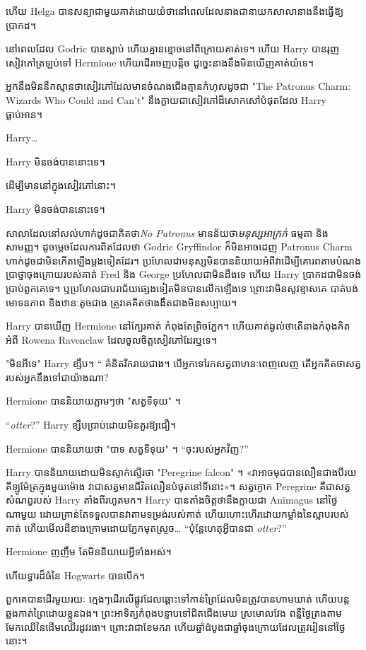 ហើយ Helga បានសន្យាជាមួយគាត់ដោយយំថានៅពេលដែលនាងជានាយកសាលានាងនឹងធ្វើឱ្យប្រាកដ។

នៅពេលដែល Godric បានស្លាប់ ហើយគ្មានខ្មោចនៅពីក្រោយគាត់ទេ។ ហើយ Harry បានរុញសៀវភៅត្រឡប់ទៅ Hermione ហើយដើរចេញបន្តិច ដូច្នេះនាងនឹងមិនឃើញគាត់យំទេ។

អ្នកនឹងមិននឹកស្មានថាសៀវភៅដែលមានចំណងជើងគ្មានកំហុសដូចជា "The Patronus Charm: Wizards Who Could and Can't" នឹងក្លាយជាសៀវភៅដ៏សោកសៅបំផុតដែល Harry ធ្លាប់អាន។

Harry…

Harry មិនចង់បាននោះទេ។

ដើម្បីមាននៅក្នុងសៀវភៅនោះ។

Harry មិនចង់បាននោះទេ។

សាលាដែលនៅសល់ហាក់ដូចជាគិតថា\emph{No Patronus} មានន័យថា\emph{មនុស្សអាក្រក់} ធម្មតា និងសាមញ្ញ។ ដូចម្ដេចដែលការពិតដែលថា Godric Gryffindor ក៏មិនអាចដេញ Patronus Charm ហាក់ដូចជាមិនកើតឡើងម្តងទៀតដែរ។ ប្រហែលជាមនុស្សមិនបាននិយាយអំពីវាដើម្បីគោរពតាមបំណងប្រាថ្នាចុងក្រោយរបស់គាត់ Fred និង George ប្រហែលជាមិនដឹងទេ ហើយ Harry ប្រាកដជាមិនចង់ប្រាប់ពួកគេទេ។ ឬ​ប្រហែល​ជា​បរាជ័យ​ផ្សេង​ទៀត​មិន​បាន​លើក​ឡើង​ទេ ព្រោះ​វា​មិន​សូវ​ខ្មាស​គេ បាត់បង់​មោទនភាព និង​ឋានៈ​តូច​ជាង ត្រូវ​គេ​គិត​ថា​ងងឹត​ជាង​មិន​សប្បាយ។

Harry បានឃើញ Hermione នៅក្បែរគាត់ កំពុងតែព្រិចភ្នែក។ ហើយគាត់ឆ្ងល់ថាតើនាងកំពុងគិតអំពី Rowena Ravenclaw ដែលចូលចិត្តសៀវភៅដែរឬទេ។

"មិនអីទេ" Harry ខ្សឹប។ “ គំនិតរីករាយជាង។ បើ​អ្នក​ទៅ​រក​សត្វ​ពាហនៈ​ពេញ​លេញ តើ​អ្នក​គិត​ថា​សត្វ​របស់​អ្នក​នឹង​ទៅ​ជា​យ៉ាង​ណា?

Hermione បាននិយាយភ្លាមៗថា "សត្វទីទុយ" ។

“\emph{otter}?” Harry ខ្សឹបប្រាប់ដោយមិនគួរឱ្យជឿ។

Hermione បាននិយាយថា "បាទ សត្វទីទុយ" ។ “ចុះរបស់អ្នកវិញ?”

Harry បាននិយាយដោយមិនស្ទាក់ស្ទើរថា "Peregrine falcon" ។ «វា​អាច​មុជ​បាន​លឿន​ជាង​បី​រយ​គីឡូម៉ែត្រ​ក្នុង​មួយ​ម៉ោង វា​ជា​សត្វ​មាន​ជីវិត​លឿន​បំផុត​នៅ​ទីនោះ»។ សត្វក្ងោក Peregrine គឺជាសត្វសំណព្វរបស់ Harry តាំងពីរហូតមក។ Harry បានតាំងចិត្តថានឹងក្លាយជា Animagus នៅថ្ងៃណាមួយ ដោយគ្រាន់តែទទួលបានវាតាមទម្រង់របស់គាត់ ហើយហោះហើរដោយកម្លាំងនៃស្លាបរបស់គាត់ ហើយមើលដីខាងក្រោមដោយភ្នែកមុតស្រួច… “ប៉ុន្តែហេតុអ្វីបានជា \emph{otter}?”

Hermione ញញឹម តែមិននិយាយអ្វីទាំងអស់។

ហើយទ្វារដ៏ធំនៃ Hogwarts បានបើក។

ពួកគេបានដើរមួយរយៈ ក្មេងៗដើរលើផ្លូវដែលឆ្ពោះទៅកាន់ព្រៃដែលមិនត្រូវបានហាមឃាត់ ហើយបន្តឆ្លងកាត់ព្រៃដោយខ្លួនឯង។ ព្រះអាទិត្យកំពុងបន្ទាបទៅជិតជើងមេឃ ស្រមោលវែង ពន្លឺថ្ងៃត្រងតាមមែកឈើនៃដើមឈើរដូវរងា។ ព្រោះវាជាខែមករា ហើយឆ្នាំដំបូងជាឆ្នាំចុងក្រោយដែលត្រូវរៀននៅថ្ងៃនោះ។

